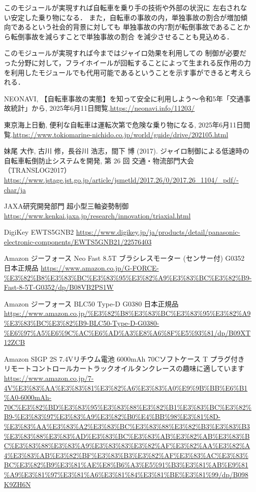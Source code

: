 \documentclass[uplatex,dvipdfmx]{jsarticle}
\begin{document}
このモジュールが実現すれば自転車を乗り手の技術や外部の状況に
左右されない安定した乗り物になる．
また，自転車の事故の内，単独事故の割合が増加傾向であるという社会的背景に対しても
単独事故の内7割が転倒事故であることから転倒事故を減らすことで単独事故の割合
を減少させることも見込める．

このモジュールが実現すれば今まではジャイロ効果を利用しての
制御が必要だった分野に対して，フライホイールが回転することによって生まれる反作用の力
を利用したモジュールでも代用可能であるということを示す事ができると考えられる．


\begin{thebibliography}{11}

 NEONAVI, 【自転車事故の実態】を知って安全に利用しよう～令和5年「交通事故統計」から, 
2025年6月11日閲覧,\url{https://neonavi.info/11203/}

 東京海上日動, 便利な自転車は運転次第で危険な乗り物になる, 
2025年6月11日閲覧,\url{https://www.tokiomarine-nichido.co.jp/world/guide/drive/202105.html}

 妹尾 大作, 古川 修，長谷川 浩志，間下 博 (2017). ジャイロ制御による低速時の
自転車転倒防止システムを開発, 第 26 回 交通・物流部門大会（TRANSLOG2017） 
\url{https://www.jstage.jst.go.jp/article/jsmetld/2017.26/0/2017.26_1104/_pdf/-char/ja}

JAXA研究開発部門 超小型三軸姿勢制御 
\url{https://www.kenkai.jaxa.jp/research/innovation/triaxial.html}


DigiKey EWTS5GNB2  \url{https://www.digikey.jp/ja/products/detail/panasonic-electronic-components/EWTS5GNB21/22576403}

Amazon ジーフォース Neo Fast 8.5T ブラシレスモーター (センサー付) G0352 日本正規品 \url{https://www.amazon.co.jp/G-FORCE-%E3%82%B8%E3%83%BC%E3%83%95%E3%82%A9%E3%83%BC%E3%82%B9-Fast-8-5T-G0352/dp/B08VB2PS1W}

Amazon ジーフォース BLC50 Type-D G0380 日本正規品
\url{https://www.amazon.co.jp/%E3%82%B8%E3%83%BC%E3%83%95%E3%82%A9%E3%83%BC%E3%82%B9-BLC50-Type-D-G0380-%E6%97%A5%E6%9C%AC%E6%AD%A3%E8%A6%8F%E5%93%81/dp/B09XT12ZCB}

Amazon SIGP 2S 7.4Vリチウム電池 6000mAh 70Cソフトケース T プラグ付き リモートコントロールカートラックオイルタンクレースの趣味に適しています
\url{https://www.amazon.co.jp/7-4V%E3%83%AA%E3%83%81%E3%82%A6%E3%83%A0%E9%9B%BB%E6%B1%A0-6000mAh-70C%E3%82%BD%E3%83%95%E3%83%88%E3%82%B1%E3%83%BC%E3%82%B9-%E3%83%97%E3%83%A9%E3%82%B0%E4%BB%98%E3%81%8D-%E3%83%AA%E3%83%A2%E3%83%BC%E3%83%88%E3%82%B3%E3%83%B3%E3%83%88%E3%83%AD%E3%83%BC%E3%83%AB%E3%82%AB%E3%83%BC%E3%83%88%E3%83%A9%E3%83%83%E3%82%AF%E3%82%AA%E3%82%A4%E3%83%AB%E3%82%BF%E3%83%B3%E3%82%AF%E3%83%AC%E3%83%BC%E3%82%B9%E3%81%AE%E8%B6%A3%E5%91%B3%E3%81%AB%E9%81%A9%E3%81%97%E3%81%A6%E3%81%84%E3%81%BE%E3%81%99/dp/B098K9ZH6N}


\end{thebibliography}
\end{document}
